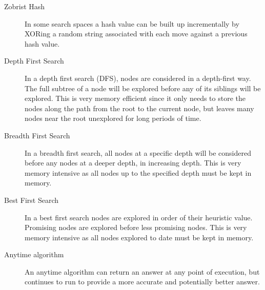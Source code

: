 \begin{description}
\item[Zobrist Hash] In some search spaces a hash value can be built up incrementally by XORing a random string associated with each move against a previous hash value.
\item[Depth First Search] In a depth first search (DFS), nodes are considered in a depth-first way. The full subtree of a node will be explored before any of its siblings will be explored. This is very memory efficient since it only needs to store the nodes along the path from the root to the current node, but leaves many nodes near the root unexplored for long periods of time.
\item[Breadth First Search] In a breadth first search, all nodes at a specific depth will be considered before any nodes at a deeper depth, in increasing depth. This is very memory intensive as all nodes up to the specified depth must be kept in memory.
\item[Best First Search] In a best first search nodes are explored in order of their heuristic value. Promising nodes are explored before less promising nodes. This is very memory intensive as all nodes explored to date must be kept in memory.
\item[Anytime algorithm] An anytime algorithm can return an answer at any point of execution, but continues to run to provide a more accurate and potentially better answer.
\end{description}
